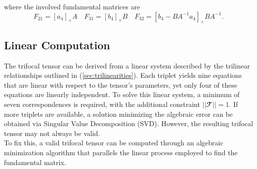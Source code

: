 where the involved fundamental matrices are
\begin{equation}
	F_{21} = [a_4]_{\times}A \quad F_{31} = [b_4]_{\times}B \quad F_{32} = [b_4 - BA^{-1}a_4]_{\times}BA^{-1}.
\end{equation}

\subsection{Linear Computation}
The trifocal tensor can be derived from a linear system described by the trilinear relationships outlined in (\ref{sec:trilinearities}). Each triplet yields nine equations that are linear with respect to the tensor's parameters, yet only four of these equations are linearly independent. To solve this linear system, a minimum of seven correspondences is required, with the additional constraint \( || \mathbfcal{T} || = 1 \). If more triplets are available, a solution minimizing the algebraic error can be obtained via Singular Value Decomposition (SVD). However, the resulting trifocal tensor may not always be valid.\\

To fix this, a valid trifocal tensor can be computed through an algebraic minimization algorithm that parallels the linear process employed to find the fundamental matrix.

